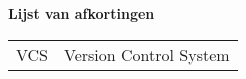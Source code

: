 \Large
\textbf{Lijst van afkortingen}
\newline
\small
\begin{table}[ht]
\small
\begin{tabular}{ll} 
VCS &Version Control System \\
\end{tabular}
\end{table}

\newpage
